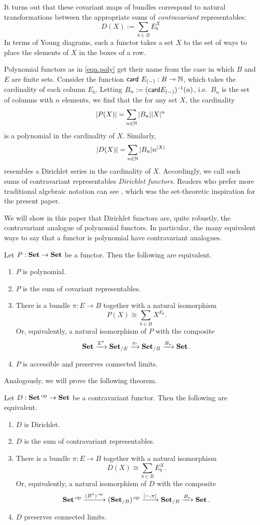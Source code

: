 It turns out that these covariant maps of bundles correspond to natural
transformations between the appropriate sums of \emph{contravariant}
representables:
$$D(X) := \sum_{b \in B} E_b^X$$
In terms of Young diagrams, such a functor takes a set $X$ to the set of ways to
place the elements of $X$ in the boxes of a row.

Polynomial functors as in \eqref{eqn.poly} get their name from the case in which $B$ and $E$ are finite sets. Consider the function $\mathsf{{card}}~E_{(-)} : B \to \operatorname{\mathbb{N}}$, which takes the cardinality of each column $E_b$. Letting $B_n := (\mathsf{{card}}E_{(-)})\operatorname{^{-1}}(n)$, i.e.\ $B_n$ is the set of columns with $n$ elements,
we find that the for any set $X$, the cardinality
$$|P(X)| = \sum_{n \in \operatorname{\mathbb{N}}} |B_n||X|^n$$
is a polynomial in the cardinality of $X$. Similarly,
$$|D(X)| = \sum_{n \in \operatorname{\mathbb{N}}} |B_n|n^{|X|}$$
resembles a Dirichlet series in the cardinality of $X$. Accordingly, we call such
sums of contravariant representables \emph{Dirichlet functors}. Readers who prefer more traditional algebraic notation can see \cite{SpivakMyers}, which was the set-theoretic inspiration for the present paper.

We will show in this paper that Dirichlet functors are, quite robustly, the
contravariant analogue of polynomial functors. In particular, the many equivalent ways to
say that a functor is polynomial have contravariant analogues.
\begin{thm}[cite]\label{thm:polynomial.set.characterization}
  Let $P : \operatorname{\textbf{Set}} \to \operatorname{\textbf{Set}}$ be a functor. Then the following are equivalent.
  \begin{enumerate}
  \item $P$ is polynomial.
  \item $P$ is the sum of covariant representables.
  \item There is a bundle $\pi : E \to B$ together with a natural isomorphism
    $$P(X) \cong \sum_{b \in B} X^{E_b}.$$
    Or, equivalently, a natural isomorphism of $P$ with the composite
    $$\operatorname{\textbf{Set}} \xrightarrow{E^{\ast}} \operatorname{\textbf{Set}}_{/E} \xrightarrow{\pi_!} \operatorname{\textbf{Set}}_{/B} \xrightarrow{B_\ast} \operatorname{\textbf{Set}}.$$
  \item $P$ is accessible and preserves connected limits.
  \end{enumerate}
\end{thm}

Analogously, we will prove the following theorem.
\begin{thm}\label{thm:dirichlet.set.characterization}
Let $D : \operatorname{\textbf{Set}}\operatorname{^\text{op}} \to \operatorname{\textbf{Set}}$ be a contravariant functor. Then the following are
equivalent.
\begin{enumerate}
\item $D$ is Dirichlet.
\item $D$ is the sum of contravariant representables.
\item There is a bundle $\pi : E \to B$ together with a natural isomorphism
  $$D(X) \cong \sum_{b \in B} E_b^X.$$
  Or, equivalently, a natural isomorphism of $D$ with the composite
  $$\operatorname{\textbf{Set}}\operatorname{^\text{op}} \xrightarrow{(B^{\ast})\operatorname{^\text{op}}} (\operatorname{\textbf{Set}}_{/B})\operatorname{^\text{op}} \xrightarrow{[-, \pi]} \operatorname{\textbf{Set}}_{/B}
  \xrightarrow{B_{\ast}} \operatorname{\textbf{Set}}.$$
\item $D$ preserves connected limits.
\end{enumerate}
\end{thm}

